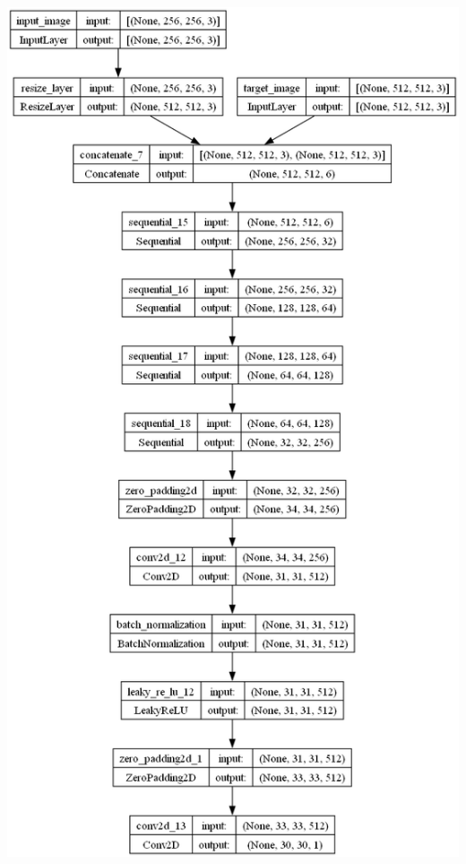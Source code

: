 \documentclass{article}
\begin{document}
\begin{enumerate}[label=\arabic*.]
        \includegraphics[height=0.95\textheight]{../imgs/patchgan_discriminator.png}
        \newpage
\end{enumerate}
\end{document}
